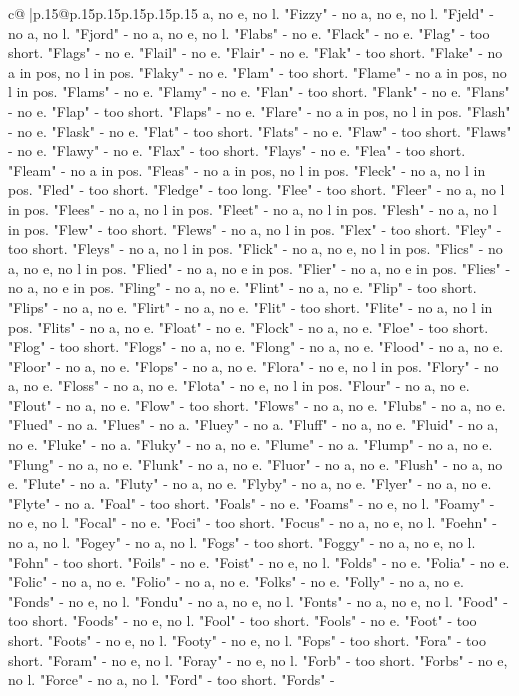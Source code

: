\documentclass{article}
\begin{document}
{\begin{supertabular}{c@{$\;$}|p{.15\linewidth}@{}p{.15\linewidth}p{.15\linewidth}p{.15\linewidth}p{.15\linewidth}p{.15\linewidth}}
{{{a, no e, no l. "Fizzy" {-} no a, no e, no l. "Fjeld" {-} no a, no l. "Fjord" {-} no a, no e, no l. "Flabs" {-} no e. "Flack" {-} no e. "Flag" {-} too short. "Flags" {-} no e. "Flail" {-} no e. "Flair" {-} no e. "Flak" {-} too short. "Flake" {-} no a in pos, no l in pos. "Flaky" {-} no e. "Flam" {-} too short. "Flame" {-} no a in pos, no l in pos. "Flams" {-} no e. "Flamy" {-} no e. "Flan" {-} too short. "Flank" {-} no e. "Flans" {-} no e. "Flap" {-} too short. "Flaps" {-} no e. "Flare" {-} no a in pos, no l in pos. "Flash" {-} no e. "Flask" {-} no e. "Flat" {-} too short. "Flats" {-} no e. "Flaw" {-} too short. "Flaws" {-} no e. "Flawy" {-} no e. "Flax" {-} too short. "Flays" {-} no e. "Flea" {-} too short. "Fleam" {-} no a in pos. "Fleas" {-} no a in pos, no l in pos. "Fleck" {-} no a, no l in pos. "Fled" {-} too short. "Fledge" {-} too long. "Flee" {-} too short. "Fleer" {-} no a, no l in pos. "Flees" {-} no a, no l in pos. "Fleet" {-} no a, no l in pos. "Flesh" {-} no a, no l in pos. "Flew" {-} too short. "Flews" {-} no a, no l in pos. "Flex" {-} too short. "Fley" {-} too short. "Fleys" {-} no a, no l in pos. "Flick" {-} no a, no e, no l in pos. "Flics" {-} no a, no e, no l in pos. "Flied" {-} no a, no e in pos. "Flier" {-} no a, no e in pos. "Flies" {-} no a, no e in pos. "Fling" {-} no a, no e. "Flint" {-} no a, no e. "Flip" {-} too short. "Flips" {-} no a, no e. "Flirt" {-} no a, no e. "Flit" {-} too short. "Flite" {-} no a, no l in pos. "Flits" {-} no a, no e. "Float" {-} no e. "Flock" {-} no a, no e. "Floe" {-} too short. "Flog" {-} too short. "Flogs" {-} no a, no e. "Flong" {-} no a, no e. "Flood" {-} no a, no e. "Floor" {-} no a, no e. "Flops" {-} no a, no e. "Flora" {-} no e, no l in pos. "Flory" {-} no a, no e. "Floss" {-} no a, no e. "Flota" {-} no e, no l in pos. "Flour" {-} no a, no e. "Flout" {-} no a, no e. "Flow" {-} too short. "Flows" {-} no a, no e. "Flubs" {-} no a, no e. "Flued" {-} no a. "Flues" {-} no a. "Fluey" {-} no a. "Fluff" {-} no a, no e. "Fluid" {-} no a, no e. "Fluke" {-} no a. "Fluky" {-} no a, no e. "Flume" {-} no a. "Flump" {-} no a, no e. "Flung" {-} no a, no e. "Flunk" {-} no a, no e. "Fluor" {-} no a, no e. "Flush" {-} no a, no e. "Flute" {-} no a. "Fluty" {-} no a, no e. "Flyby" {-} no a, no e. "Flyer" {-} no a, no e. "Flyte" {-} no a. "Foal" {-} too short. "Foals" {-} no e. "Foams" {-} no e, no l. "Foamy" {-} no e, no l. "Focal" {-} no e. "Foci" {-} too short. "Focus" {-} no a, no e, no l. "Foehn" {-} no a, no l. "Fogey" {-} no a, no l. "Fogs" {-} too short. "Foggy" {-} no a, no e, no l. "Fohn" {-} too short. "Foils" {-} no e. "Foist" {-} no e, no l. "Folds" {-} no e. "Folia" {-} no e. "Folic" {-} no a, no e. "Folio" {-} no a, no e. "Folks" {-} no e. "Folly" {-} no a, no e. "Fonds" {-} no e, no l. "Fondu" {-} no a, no e, no l. "Fonts" {-} no a, no e, no l. "Food" {-} too short. "Foods" {-} no e, no l. "Fool" {-} too short. "Fools" {-} no e. "Foot" {-} too short. "Foots" {-} no e, no l. "Footy" {-} no e, no l. "Fops" {-} too short. "Fora" {-} too short. "Foram" {-} no e, no l. "Foray" {-} no e, no l. "Forb" {-} too short. "Forbs" {-} no e, no l. "Force" {-} no a, no l. "Ford" {-} too short. "Fords" {-} }}}
\end{supertabular}}
\end{document}

